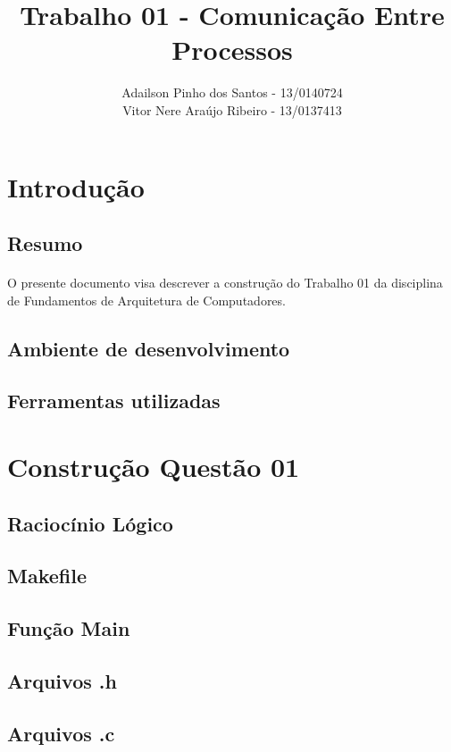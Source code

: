 \documentclass[11pt]{article}
\begin{document}
\title{Trabalho 01 - Comunica\c{c}\~ao Entre Processos}
\author{Adailson Pinho dos Santos - 13/0140724\\
Vitor Nere Ara\'ujo Ribeiro - 13/0137413}
\date{}
\maketitle

\newpage

\tableofcontents

\newpage

\section{Introdu\c{c}\~ao}
	\subsection{Resumo}
	\paragraph{}	O presente documento visa descrever a constru\c{c}\~ao do Trabalho 01 da disciplina de Fundamentos de Arquitetura de Computadores. 
	\subsection{Ambiente de desenvolvimento}
	\subsection{Ferramentas utilizadas}
\section{Constru\c{c}\~ao Quest\~ao 01}
	\subsection{Racioc\'inio L\'ogico}
	\subsection{Makefile}
	\subsection{Fun\c{c}\~ao Main}
	\subsection{Arquivos .h}
	\subsection{Arquivos .c}
\end{document}
